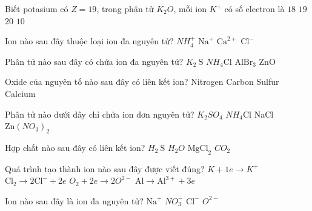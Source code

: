 	\begin{ex}
		Biết potasium có $Z=19$, trong phân tử $K_2O$, mỗi ion $K^{+}$ có số electron là
		\choice
		{\True $18$}
		{$19$}
		{$20$}
		{$10$}
		\loigiai{}
	\end{ex}
	
	\begin{ex}
		Ion nào sau đây thuộc loại ion đa nguyên tử?
		\choice
		{\True $NH_4^{+}$}
		{$\mathrm{Na}^{+}$}
		{$\mathrm{Ca}^{2+}$}
		{$\mathrm{Cl}^{-}$}
		\loigiai{}
	\end{ex}
	
	\begin{ex}
		Phân tử nào sau đây có chứa ion đa nguyên tử?
		\choice
		{$K_2\mathrm{~S}$}
		{\True $NH_4\mathrm{Cl}$}
		{$\mathrm{AlBr}_3$}
		{ZnO}
		\loigiai{}
	\end{ex}
	
	\begin{ex}
		Oxide của nguyên tố nào sau đây có liên kết ion?
		\choice
		{Nitrogen}
		{Carbon}
		{Sulfur}
		{\True Calcium}
		\loigiai{}
	\end{ex}
	
	\begin{ex}
		Phân tử nào dưới đây chỉ chứa ion đơn nguyên tử?
		\choice
		{$K_2SO_4$}
		{$NH_4\mathrm{Cl}$}
		{\True NaCl}
		{$\mathrm{Zn}\left(NO_3\right)_2$}
		\loigiai{}
	\end{ex}
	
	\begin{ex}
		Hợp chất nào sau đây có liên kết ion?
		\choice
		{$H_2\mathrm{~S}$}
		{$H_2O$}
		{\True $\mathrm{MgCl}_2$}
		{$CO_2$}
		\loigiai{}
	\end{ex}
	
	\begin{ex}
		Quá trình tạo thành ion nào sau đây được viết đúng?
		\choice
		{$K+1e \to K^{+}$}
		{$\mathrm{Cl}_2\to 2\mathrm{Cl}^{-}+2e$}
		{$O_2+2e \to 2O^{2-}$}
		{\True $\mathrm{Al} \to \mathrm{Al}^{3+}+3e$}
		\loigiai{}
	\end{ex}
	
	\begin{ex}
		Ion nào sau đây là ion đa nguyên tử?
		\choice
		{$\mathrm{Na}^{+}$}
		{\True $NO_3^{-}$}
		{$\mathrm{Cl}^{-}$}
		{$O^{2-}$}
		\loigiai{}
	\end{ex}
	
